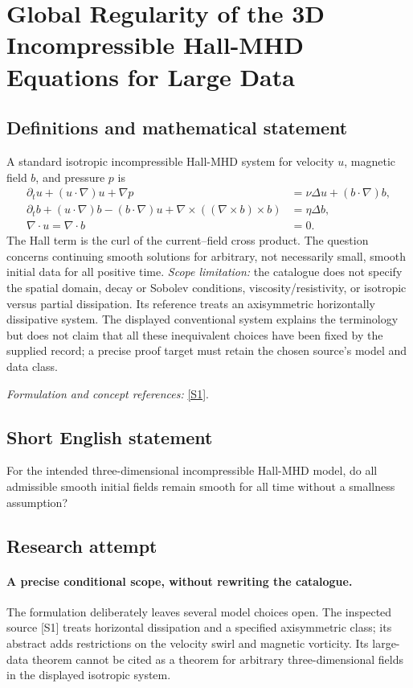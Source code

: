 \documentclass[11pt]{article}
\begin{document}
\section*{\texorpdfstring{Global Regularity of the 3D Incompressible Hall-MHD Equations for Large Data}{Global Regularity of the 3D Incompressible Hall-MHD Equations for Large Data}}\label{statement}
\subsection{Definitions and mathematical statement}
A standard isotropic incompressible Hall-MHD system for velocity $u$, magnetic field $b$, and pressure $p$ is
\[
 \begin{aligned}
 \partial_tu+(u\cdot\nabla)u+\nabla p&=\nu\Delta u+(b\cdot\nabla)b,\\
 \partial_tb+(u\cdot\nabla)b-(b\cdot\nabla)u
   +\nabla\times((\nabla\times b)\times b)&=\eta\Delta b,\\
 \nabla\cdot u=\nabla\cdot b&=0.
 \end{aligned}
\]
The Hall term is the curl of the current--field cross product. The question concerns continuing smooth solutions for arbitrary, not necessarily small, smooth initial data for all positive time. \emph{Scope limitation:} the catalogue does not specify the spatial domain, decay or Sobolev conditions, viscosity/resistivity, or isotropic versus partial dissipation. Its reference treats an axisymmetric horizontally dissipative system. The displayed conventional system explains the terminology but does not claim that all these inequivalent choices have been fixed by the supplied record; a precise proof target must retain the chosen source's model and data class.
\par\smallskip\textit{Formulation and concept references:} \href{https://link.springer.com/article/10.1007/s44198-022-00063-8}{[S1]}.

\subsection{Short English statement}
For the intended three-dimensional incompressible Hall-MHD model, do all admissible smooth initial fields remain smooth for all time without a smallness assumption?
\subsection{Research attempt}
\paragraph{A precise conditional scope, without rewriting the catalogue.}
The formulation deliberately leaves several model choices open.
The inspected source [S1] treats horizontal dissipation and a
specified axisymmetric class; its abstract adds restrictions on
the velocity swirl and magnetic vorticity. Its large-data theorem
cannot be cited as a theorem for arbitrary three-dimensional
fields in the displayed isotropic system.
\end{document}
